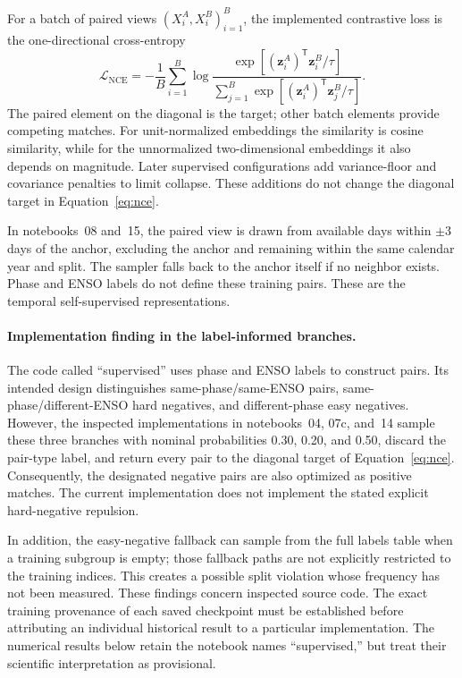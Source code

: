 \documentclass[11pt]{article}
\begin{document}
For a batch of paired views $(X_i^A,X_i^B)_{i=1}^{B}$, the implemented contrastive loss is the one-directional cross-entropy
\begin{equation}
\mathcal L_{\mathrm{NCE}}=
-\frac{1}{B}\sum_{i=1}^{B}
\log\frac{\exp\!\left[(\mathbf z_i^A)^\mathsf T\mathbf z_i^B/\tau\right]}
{\sum_{j=1}^{B}\exp\!\left[(\mathbf z_i^A)^\mathsf T\mathbf z_j^B/\tau\right]}.
\label{eq:nce}
\end{equation}
The paired element on the diagonal is the target; other batch elements provide competing matches. For unit-normalized embeddings the similarity is cosine similarity, while for the unnormalized two-dimensional embeddings it also depends on magnitude. Later supervised configurations add variance-floor and covariance penalties to limit collapse. These additions do not change the diagonal target in Equation~\eqref{eq:nce}.

In notebooks~08 and~15, the paired view is drawn from available days within $\pm3$ days of the anchor, excluding the anchor and remaining within the same calendar year and split. The sampler falls back to the anchor itself if no neighbor exists. Phase and ENSO labels do not define these training pairs. These are the temporal self-supervised representations.

\paragraph{Implementation finding in the label-informed branches.}
The code called ``supervised'' uses phase and ENSO labels to construct pairs. Its intended design distinguishes same-phase/same-ENSO pairs, same-phase/different-ENSO hard negatives, and different-phase easy negatives. However, the inspected implementations in notebooks~04, 07c, and~14 sample these three branches with nominal probabilities 0.30, 0.20, and 0.50, discard the pair-type label, and return every pair to the diagonal target of Equation~\eqref{eq:nce}. Consequently, the designated negative pairs are also optimized as positive matches. The current implementation does not implement the stated explicit hard-negative repulsion.

In addition, the easy-negative fallback can sample from the full labels table when a training subgroup is empty; those fallback paths are not explicitly restricted to the training indices. This creates a possible split violation whose frequency has not been measured. These findings concern inspected source code. The exact training provenance of each saved checkpoint must be established before attributing an individual historical result to a particular implementation. The numerical results below retain the notebook names ``supervised,'' but treat their scientific interpretation as provisional.
\end{document}
